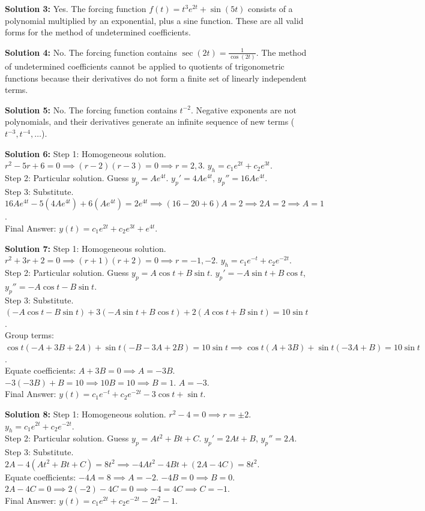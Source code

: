 \documentclass[11pt]{article}
\begin{document}
\textbf{Solution 3:}
Yes. The forcing function $f(t) = t^3 e^{2t} + \sin(5t)$ consists of a polynomial multiplied by an exponential, plus a sine function. These are all valid forms for the method of undetermined coefficients.

\textbf{Solution 4:}
No. The forcing function contains $\sec(2t) = \frac{1}{\cos(2t)}$. The method of undetermined coefficients cannot be applied to quotients of trigonometric functions because their derivatives do not form a finite set of linearly independent terms.

\textbf{Solution 5:}
No. The forcing function contains $t^{-2}$. Negative exponents are not polynomials, and their derivatives generate an infinite sequence of new terms ($t^{-3}, t^{-4}, \dots$).

\textbf{Solution 6:}
Step 1: Homogeneous solution. $r^2 - 5r + 6 = 0 \implies (r-2)(r-3) = 0 \implies r = 2, 3$. $y_h = c_1e^{2t} + c_2e^{3t}$. \\
Step 2: Particular solution. Guess $y_p = Ae^{4t}$. $y_p' = 4Ae^{4t}$, $y_p'' = 16Ae^{4t}$. \\
Step 3: Substitute. $16Ae^{4t} - 5(4Ae^{4t}) + 6(Ae^{4t}) = 2e^{4t} \implies (16 - 20 + 6)A = 2 \implies 2A = 2 \implies A = 1$. \\
Final Answer: $y(t) = c_1e^{2t} + c_2e^{3t} + e^{4t}$.

\textbf{Solution 7:}
Step 1: Homogeneous solution. $r^2 + 3r + 2 = 0 \implies (r+1)(r+2) = 0 \implies r = -1, -2$. $y_h = c_1e^{-t} + c_2e^{-2t}$. \\
Step 2: Particular solution. Guess $y_p = A\cos t + B\sin t$. $y_p' = -A\sin t + B\cos t$, $y_p'' = -A\cos t - B\sin t$. \\
Step 3: Substitute. $(-A\cos t - B\sin t) + 3(-A\sin t + B\cos t) + 2(A\cos t + B\sin t) = 10\sin t$. \\
Group terms: $\cos t(-A + 3B + 2A) + \sin t(-B - 3A + 2B) = 10\sin t \implies \cos t(A + 3B) + \sin t(-3A + B) = 10\sin t$. \\
Equate coefficients: $A + 3B = 0 \implies A = -3B$. $-3(-3B) + B = 10 \implies 10B = 10 \implies B = 1$. $A = -3$. \\
Final Answer: $y(t) = c_1e^{-t} + c_2e^{-2t} - 3\cos t + \sin t$.

\textbf{Solution 8:}
Step 1: Homogeneous solution. $r^2 - 4 = 0 \implies r = \pm 2$. $y_h = c_1e^{2t} + c_2e^{-2t}$. \\
Step 2: Particular solution. Guess $y_p = At^2 + Bt + C$. $y_p' = 2At + B$, $y_p'' = 2A$. \\
Step 3: Substitute. $2A - 4(At^2 + Bt + C) = 8t^2 \implies -4At^2 - 4Bt + (2A - 4C) = 8t^2$. \\
Equate coefficients: $-4A = 8 \implies A = -2$. $-4B = 0 \implies B = 0$. $2A - 4C = 0 \implies 2(-2) - 4C = 0 \implies -4 = 4C \implies C = -1$. \\
Final Answer: $y(t) = c_1e^{2t} + c_2e^{-2t} - 2t^2 - 1$.
\end{document}
